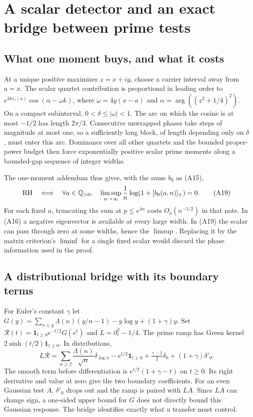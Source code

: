 \documentclass[
  10pt,
  a4paper,
  10pt,
  oneside,
  openany]{book}
\begin{document}
\section{A scalar detector and an exact bridge between prime
tests}\label{atlas-transfer}

\subsection{What one moment buys, and what it
costs}\label{what-one-moment-buys-and-what-it-costs}

At a unique positive maximizer \(z=x+iy\), choose a carrier interval
away from \(a=x\). The scalar quartet contribution is proportional in
leading order to \(e^{2ks_z(a)}\cos(\alpha-\omega k)\), where
\(\omega=4y(x-a)\) and \(\alpha=\arg((z^2+1/4)^2)\). On a compact
subinterval, \(0<\delta\le|\omega|<1\). The arc on which the cosine is
at most \(-1/2\) has length \(2\pi/3\). Consecutive unwrapped phases
take steps of magnitude at most one, so a sufficiently long block, of
length depending only on \(\delta\), must enter this arc. Dominance over
all other quartets and the bounded proper-power budget then force
exponentially positive scalar prime moments along a bounded-gap sequence
of integer widths.

The one-moment addendum thus gives, with the same \(b_0\) as (A15), \[
 {\rm RH}\quad\Longleftrightarrow\quad
 \forall a\in\mathbb Q_{>0},\quad
 \limsup_{n\to\infty}\frac1n\log(1+[b_0(a,n)]_+)=0 .
 \tag{A19}\label{eq:A19}
\] For each fixed \(a\), truncating the sum at \(p\le e^{4n}\) costs
\(O_a(n^{-1/2})\) in that note. In (A16) a negative eigenvector is
available at every large width. In (A19) the scalar can pass through
zero at some widths, hence the \(\limsup\). Replacing it by the matrix
criterion's \(\liminf\) for a single fixed scalar would discard the
phase information used in the proof.

\subsection{A distributional bridge with its boundary
terms}\label{a-distributional-bridge-with-its-boundary-terms}

For Euler's constant \(\gamma\) let
\(G(y)=\sum_{n\le y}\Lambda(n)(y/n-1)-y\log y+(1+\gamma)y\). Set
\(\mathcal R(t)=\mathbf1_{t\ge0}e^{-t/2}G(e^t)\) and
\(L=\partial_t^2-1/4\). The prime ramp has Green kernel
\(2\sinh(t/2)\mathbf1_{t\ge0}\). In distributions, \[
 L\mathcal R
 =\sum_{n\ge2}\frac{\Lambda(n)}{\sqrt n}\delta_{\log n}
  -e^{t/2}\mathbf1_{t\ge0}
  +\tfrac{\gamma-1}{2}\delta_0+(1+\gamma)\delta'_0 .
 \tag{A20}\label{eq:A20}
\] The smooth term before differentiation is \(e^{t/2}(1+\gamma-t)\) on
\(t\ge0\). Its right derivative and value at zero give the two boundary
coefficients. For an even Gaussian test \(A\), \(\delta'_0\) drops out
and the ramp is paired with \(LA\). Since \(LA\) can change sign, a
one-sided upper bound for \(G\) does not directly bound this Gaussian
response. The bridge identifies exactly what a transfer must control.
\end{document}
